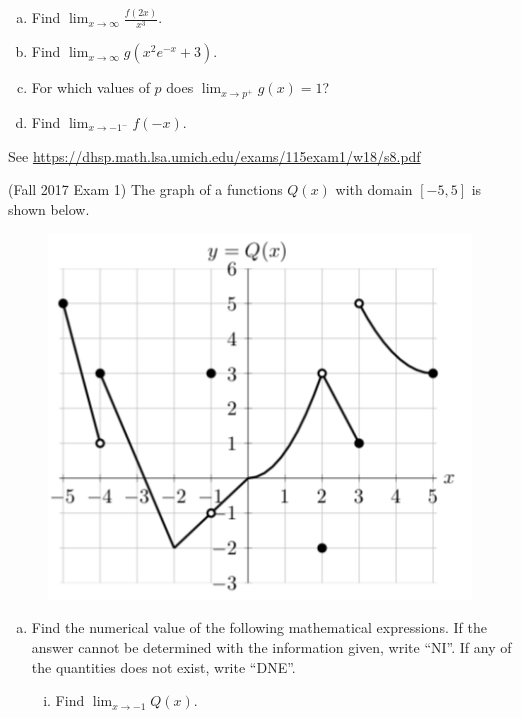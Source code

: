 \documentclass[11pt]{exam}
\begin{document}
\begin{questions}
\begin{enumerate}[(a)]
\item Find $\displaystyle\lim_{x \rightarrow \infty} \frac{f(2x)}{x^3}$.

  
\item Find $\displaystyle\lim_{x \rightarrow \infty} g(x^2e^{-x} + 3)$.

\item For which values of \(p\) does $\displaystyle\lim_{x \rightarrow p^+} g(x)= 1$?

\item Find $\displaystyle\lim_{x \rightarrow -1^-} f(-x)$.
\end{enumerate}
\begin{solution}
 See \href{https://dhsp.math.lsa.umich.edu/exams/115exam1/w18/s8.pdf}{https://dhsp.math.lsa.umich.edu/exams/115exam1/w18/s8.pdf}
\end{solution}
\pagebreak
\question (Fall 2017 Exam 1) The graph of a functions $Q(x)$ with domain $[-5,5]$ is shown below.

\begin{figure}[h]
\includegraphics[scale=0.5]{discontinuities2}
\end{figure}
\begin{enumerate}[(a)]
\item Find the numerical value of the following mathematical expressions. If the answer cannot be determined with the information given, write “NI”. If any of the quantities does not exist, write “DNE”.
\begin{enumerate}[(i)]
\item Find $\displaystyle\lim_{x \rightarrow -1} Q(x)$.


\end{enumerate}
\end{enumerate}
\end{questions}
\end{document}
